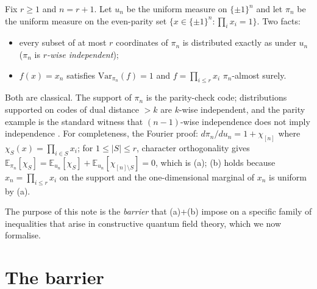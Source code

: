 \documentclass[11pt]{article}
\theoremstyle{remark}
\newcommand{\Var}{\mathrm{Var}}
\begin{document}
Fix $r \ge 1$ and $n = r+1$. Let $u_n$ be the uniform measure on
$\{\pm1\}^n$ and let $\pi_n$ be the uniform measure on the even-parity
set $\{x \in \{\pm1\}^n : \prod_i x_i = 1\}$. Two facts:

\begin{itemize}
\item[(a)] every subset of at most $r$ coordinates of $\pi_n$ is
distributed exactly as under $u_n$ ($\pi_n$ is \emph{$r$-wise
independent});
\item[(b)] $f(x) = x_n$ satisfies $\Var_{\pi_n}(f) = 1$ and
$f = \prod_{i \le r} x_i$ $\pi_n$-almost surely.
\end{itemize}

Both are classical. The support of $\pi_n$ is the parity-check code;
distributions supported on codes of dual distance $> k$ are $k$-wise
independent, and the parity example is the standard witness that
$(n-1)$-wise independence does not imply independence
\cite{Joffe, ABI, AGM, AlonSpencer}. For completeness, the Fourier
proof: $d\pi_n/du_n = 1 + \chi_{[n]}$ where
$\chi_S(x) = \prod_{i\in S} x_i$; for $1 \le |S| \le r$, character
orthogonality gives $\mathbb{E}_{\pi_n}[\chi_S] =
\mathbb{E}_{u_n}[\chi_S] + \mathbb{E}_{u_n}[\chi_{[n]\setminus S}] =
0$, which is (a); (b) holds because $x_n = \prod_{i\le r} x_i$ on the
support and the one-dimensional marginal of $x_n$ is uniform by (a).

The purpose of this note is the \emph{barrier} that (a)+(b) impose on
a specific family of inequalities that arise in constructive quantum
field theory, which we now formalise.

\section{The barrier}
\end{document}
